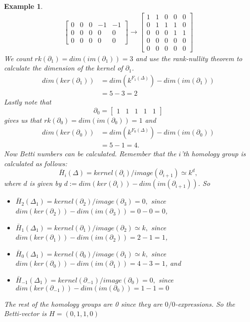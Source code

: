 \documentclass[11pt,a4paper,twoside]{report}
\newtheorem{myex}[mythm]{Example}
\begin{document}
\begin{myex}
\begin{align*}
\begin{bmatrix}
0 & 0 & 0 & -1 & -1\\
0 & 0 & 0 & 0 & 0\\
0 & 0 & 0 & 0 & 0
\end{bmatrix}
\to
\begin{bmatrix}
1 & 1 & 0 & 0 & 0\\
0 & 1 & 1 & 1 & 0\\
0 & 0 & 0 & 1 & 1\\
0 & 0 & 0 & 0 & 0\\
0 & 0 & 0 & 0 & 0
\end{bmatrix}
\end{align*}
We count $rk(\partial_1)=dim(im(\partial_1))=3$ and use the rank-nullity theorem to calculate the dimension of the kernel of $\partial_1$.
\begin{align*}
dim(ker(\partial_1))&=dim(k^{F_1(\Delta)})-dim(im(\partial_1))\\
&=5-3= 2
\end{align*}
Lastly note that 
\begin{equation*}
\partial_0=
\begin{bmatrix}
1 & 1 & 1 & 1 & 1 
\end{bmatrix}
\end{equation*}
gives us that $rk(\partial_0)=dim(im(\partial_0))=1$ and 
\begin{align*}
dim(ker(\partial_0))&=dim(k^{F_0(\Delta)})-dim(im(\partial_0))\\
&=5-1= 4.
\end{align*}
Now Betti numbers can be calculated. Remember that the $i$'th homology group is calculated as follows:
\begin{equation*}
\bar{H}_i(\Delta)=kernel(\partial_i)/image(\partial_{i+1})\simeq k^d,
\end{equation*}
where $d$ is given by $d:=dim(ker(\partial_i))-dim(im(\partial_{i+1}))$. So 
\begin{itemize}
\item$\bar{H}_2(\Delta_1)=kernel(\partial_2)/image(\partial_{3})=0,$
since $dim(ker(\partial_2))-dim(im(\partial_{3}))=0-0=0$,
\item$\bar{H}_1(\Delta_1)=kernel(\partial_1)/image(\partial_{2})\simeq k,$ since $dim(ker(\partial_1))-dim(im(\partial_{2}))=2-1=1$,
\item$\bar{H}_0(\Delta_1)=kernel(\partial_0)/image(\partial_{1})\simeq k,$
since $dim(ker(\partial_0))-dim(im(\partial_{1}))=4-3=1$, and 
\item$\bar{H}_{-1}(\Delta_1)=kernel(\partial_{-1})/image(\partial_{0})=0,$
since $dim(ker(\partial_{-1}))-dim(im(\partial_{0}))=1-1=0$
\end{itemize}
The rest of the homology groups are 0 since they are $0/0$-expressions.
So the Betti-vector is $H=(0,1,1,0)$
\end{myex}
\end{document}
